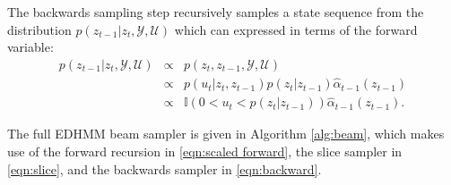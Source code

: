 

The backwards sampling step recursively samples a state sequence from the distribution $p(z_{t-1} | z_{t}, \mathcal{Y}, \mathcal{U})$
which can expressed in terms of the forward variable:
\begin{eqnarray}
    p(z_{t-1} | z_{t}, \mathcal{Y}, \mathcal{U}) &\propto& p(z_{t},z_{t-1}, \mathcal{Y}, \mathcal{U})  \label{eqn:backward} \\
    & \propto &  
        p(u_{t} | z_t, z_{t-1})p(z_{t}|z_{t-1}) \hat{\alpha}_{t-1}(z_{t-1})
        \nonumber\\
    & \propto & 
       \mathbb{I}(0 < u_{t} < p(z_{t} | z_{t-1}))
        \hat{\alpha}_{t-1}(z_{t-1}).\nonumber
\end{eqnarray}


The full EDHMM beam sampler is given in Algorithm \ref{alg:beam}, which makes use of the forward recursion in \eqref{eqn:scaled forward}, the slice sampler in \eqref{eqn:slice}, and the backwards sampler in \eqref{eqn:backward}.

